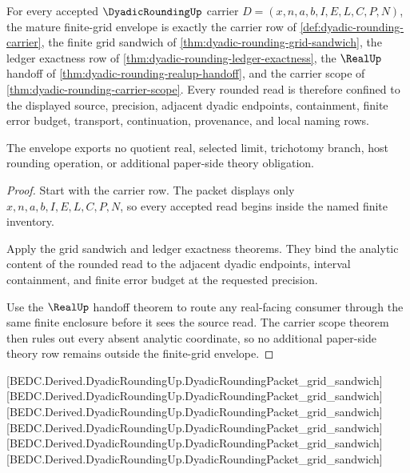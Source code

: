 \begin{theorem}
\label{thm:dyadic-rounding-mature-grid-envelope}
For every accepted $\DyadicRoundingUp$ carrier $D=(x,n,a,b,I,E,L,C,P,N)$, the mature finite-grid envelope is exactly the carrier row of \autoref{def:dyadic-rounding-carrier}, the finite grid sandwich of \autoref{thm:dyadic-rounding-grid-sandwich}, the ledger exactness row of \autoref{thm:dyadic-rounding-ledger-exactness}, the $\RealUp$ handoff of \autoref{thm:dyadic-rounding-realup-handoff}, and the carrier scope of \autoref{thm:dyadic-rounding-carrier-scope}. Every rounded read is therefore confined to the displayed source, precision, adjacent dyadic endpoints, containment, finite error budget, transport, continuation, provenance, and local naming rows.

The envelope exports no quotient real, selected limit, trichotomy branch, host rounding operation, or additional paper-side theory obligation.
\end{theorem}
\begin{proof}
Start with the carrier row. The packet displays only $x,n,a,b,I,E,L,C,P,N$, so every accepted read begins inside the named finite inventory.

Apply the grid sandwich and ledger exactness theorems. They bind the analytic content of the rounded read to the adjacent dyadic endpoints, interval containment, and finite error budget at the requested precision.

Use the $\RealUp$ handoff theorem to route any real-facing consumer through the same finite enclosure before it sees the source read. The carrier scope theorem then rules out every absent analytic coordinate, so no additional paper-side theory row remains outside the finite-grid envelope.
\end{proof}

[BEDC.Derived.DyadicRoundingUp.DyadicRoundingPacket\_grid\_sandwich]
[BEDC.Derived.DyadicRoundingUp.DyadicRoundingPacket\_grid\_sandwich]
[BEDC.Derived.DyadicRoundingUp.DyadicRoundingPacket\_grid\_sandwich]
[BEDC.Derived.DyadicRoundingUp.DyadicRoundingPacket\_grid\_sandwich]
[BEDC.Derived.DyadicRoundingUp.DyadicRoundingPacket\_grid\_sandwich]
[BEDC.Derived.DyadicRoundingUp.DyadicRoundingPacket\_grid\_sandwich]

